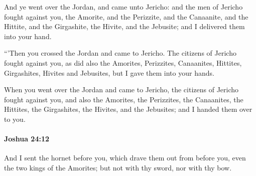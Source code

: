 			\begin{versebox}
					\item[BHS] 
					\item[ASV] And ye went over the Jordan, and came unto Jericho: and the men of Jericho fought against you, the Amorite, and the Perizzite, and the Canaanite, and the Hittite, and the Girgashite, the Hivite, and the Jebusite; and I delivered them into your hand.
					\item[NIV] “’Then you crossed the Jordan and came to Jericho. The citizens of Jericho fought against you, as did also the Amorites, Perizzites, Canaanites, Hittites, Girgashites, Hivites and Jebusites, but I gave them into your hands.
					\item[NRSV] When you went over the Jordan and came to Jericho, the citizens of Jericho fought against you, and also the Amorites, the Perizzites, the Canaanites, the Hittites, the Girgashites, the Hivites, and the Jebusites; and I handed them over to you.
			\end{versebox}

		\paragraph{Joshua 24:12} %
			\label{JOSHUA-24-12}

			And I sent the hornet before you, which drave them out from before you, even the two kings of the Amorites; but not with thy sword, nor with thy bow.

